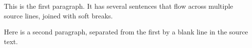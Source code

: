 This is the first paragraph. It has several sentences that flow
across multiple source lines, joined with soft breaks.

Here is a second paragraph, separated from the first by a blank
line in the source text.
